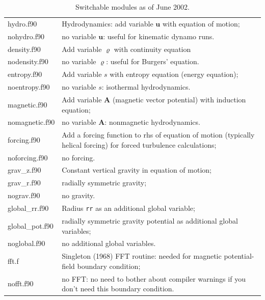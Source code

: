 \documentclass[12pt,twoside,notitlepage,a4paper]{article}
\newcommand{\vekt}[1] {\mathbf{#1}}
\newcommand{\Av}            {\vekt{A}}
\newcommand{\uv}            {\vekt{u}}
\begin{document}
\begin{table}
  \centering
  \caption{%
    Switchable modules as of June 2002.
  }
  \label{Tab-modules}
  \begin{tabular}{lp{}}
    \toprule
    hydro.f90      & Hydrodynamics: add variable $\uv$ with equation of
                     motion; \\
    nohydro.f90    & no variable $\uv$: useful for kinematic dynamo runs. \\
    \midrule
    density.f90    & Add variable $\varrho$ with continuity equation \\
    nodensity.f90  & no variable $\varrho$: useful for Burgers' equation. \\
    \midrule
    entropy.f90    & Add variable $s$ with entropy equation (energy
                     equation); \\
    noentropy.f90  & no variable $s$: isothermal hydrodynamics. \\
    \midrule
    magnetic.f90   & Add variable $\Av$ (magnetic vector potential) with
                     induction equation; \\
    nomagnetic.f90 & no variable $\Av$: nonmagnetic hydrodynamics. \\
    \midrule
    \midrule
    forcing.f90    & Add a forcing function to rhs of equation of motion
                    (typically helical forcing) for forced turbulence
                    calculations; \\
    noforcing.f90  & no forcing. \\
    \midrule
    grav_z.f90     & Constant vertical gravity in equation of motion; \\
    grav_r.f90     & radially symmetric gravity; \\
    nograv.f90     & no gravity. \\
    \midrule
    \midrule
    global_rr.f90  & Radius \verb|rr| as an additional global variable; \\
    global_pot.f90 & radially symmetric gravity potential as additional
                     global variables; \\
    noglobal.f90   & no additional global variables. \\
    \midrule
    fft.f          & Singleton (1968) FFT routine: needed for magnetic
                     potential-field boundary condition; \\
    nofft.f90      & no FFT: no need to bother about compiler warnings if
                     you don't need this boundary condition. \\

\end{tabular}
\end{table}
\end{document}
